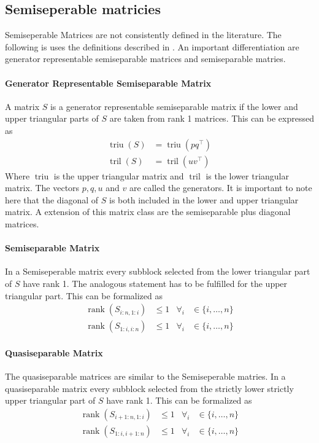 \documentclass[doctype=mastersthesis,BCOR=15mm,biblatex]{ldvbook}%
\DeclareMathOperator{\rank}{rank}
\DeclareMathOperator{\triu}{triu}
\DeclareMathOperator{\tril}{tril}
\begin{document}
\subsection{Semiseperable matricies}
Semiseperable Matrices are not consistently defined in the literature. The following is uses the definitions described in \cite{vandebril_bibliography_2005,}.
An important differentiation are generator representable semiseparable matrices and semiseparable matries.
\paragraph{Generator Representable Semiseparable Matrix}
A matrix $S$ is a generator representable semiseparable matrix if the lower and upper triangular parts of $S$ are taken from rank 1 matrices.
This can be expressed as 
\begin{align}
	\triu(S) &= \triu(pq^\top)\\
	\tril(S) &= \tril(uv^\top)
\end{align}
Where $\triu$ is the upper triangular matrix and $\tril$ is the lower triangular matrix. The vectors $p,q,u$ and $v$ are called the generators.
It is important to note here that the diagonal of $S$ is both included in the lower and upper triangular matrix.
A extension of this matrix class are the semiseparable plus diagonal matrices.  


\paragraph{Semiseparable Matrix}
In a Semiseperable matrix every subblock selected from the lower triangular part of $S$ have rank 1. The analogous statement has to be fulfilled for the upper triangular part.
This can be formalized as 
\begin{align}
	\rank(S_{i:n,1:i}) &\leq 1 & \forall_i &\in\{i,\dots,n\}\\
	\rank(S_{1:i,i:n}) &\leq 1 & \forall_i &\in\{i,\dots,n\}
\end{align}


\paragraph{Quasiseparable Matrix}
The quasiseparable matrices are similar to the Semiseperable matries. In a quasiseparable matrix every subblock selected from the strictly lower strictly upper triangular part of $S$ have rank 1. 
This can be formalized as 
\begin{align}
\rank(S_{i+1:n,1:i}) &\leq 1 & \forall_i &\in\{i,\dots,n\}\\
\rank(S_{1:i,i+1:n}) &\leq 1 & \forall_i &\in\{i,\dots,n\}
\end{align}
\end{document}
